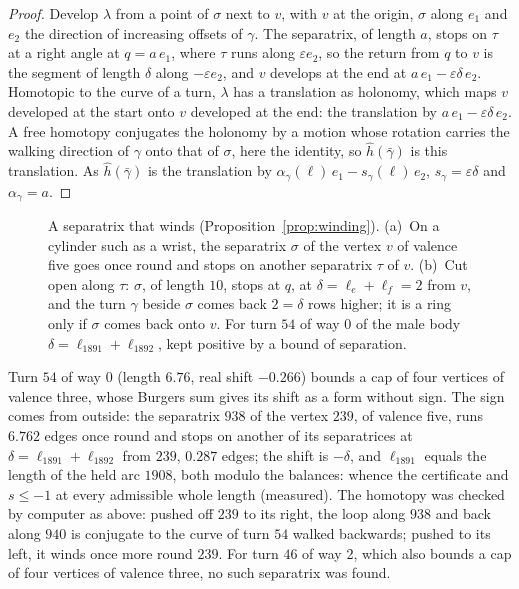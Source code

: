 \documentclass[11pt,a4paper]{article}
\newcommand{\shift}{s}
\begin{document}
\begin{proof}
Develop $\lambda$ from a point of $\sigma$ next to $v$, with $v$ at the origin,
$\sigma$ along $e_1$ and $e_2$ the direction of increasing offsets of
$\gamma$. The separatrix, of length $a$, stops on $\tau$ at a right angle at
$q = a\,e_1$, where $\tau$ runs along $\varepsilon e_2$, so the return from
$q$ to $v$ is the segment of length $\delta$ along $-\varepsilon e_2$, and $v$
develops at the end at $a\,e_1 - \varepsilon\delta\,e_2$. Homotopic to the
curve of a turn, $\lambda$ has a translation as holonomy, which maps $v$
developed at the start onto $v$ developed at the end: the translation by $a\,e_1
- \varepsilon\delta\,e_2$. A free homotopy conjugates the holonomy by a motion
whose rotation carries the walking direction of $\gamma$ onto that of
$\sigma$, here the identity, so $\hat h(\bar\gamma)$ is this translation. As
$\hat h(\bar\gamma)$ is the translation by $\alpha_\gamma(\ell)\,e_1 -
\shift_\gamma(\ell)\,e_2$, $\shift_\gamma = \varepsilon\delta$ and
$\alpha_\gamma = a$.
\end{proof}

\begin{figure}[t]
\centering

\caption{A separatrix that winds (Proposition~\ref{prop:winding}). (a)~On
a cylinder such as a wrist, the separatrix $\sigma$ of the vertex $v$ of
valence five goes once round and stops on another separatrix $\tau$ of $v$.
(b)~Cut open along $\tau$: $\sigma$, of length $10$, stops at $q$, at
$\delta = \ell_e + \ell_f = 2$ from $v$, and the turn $\gamma$ beside
$\sigma$ comes back $2 = \delta$ rows higher; it is a ring only if $\sigma$
comes back onto $v$. For turn $54$ of way 0 of the male body $\delta =
\ell_{1891} + \ell_{1892}$, kept positive by a bound of separation.}
\label{fig:separatrix}
\end{figure}

Turn $54$ of way 0 (length $6.76$, real shift $-0.266$) bounds a cap of four
vertices of valence three, whose Burgers sum gives its shift as a form
without sign. The sign comes from outside: the separatrix $938$ of the vertex
$239$, of valence five, runs $6.762$ edges once round and stops on another of
its separatrices at $\delta = \ell_{1891} + \ell_{1892}$ from $239$, $0.287$
edges; the shift is $-\delta$, and $\ell_{1891}$ equals the length of the held
arc $1908$, both modulo the balances: whence the certificate and $\shift \le
-1$ at every admissible whole length (measured). The homotopy was checked by
computer as above: pushed off $239$ to its right, the loop along $938$ and
back along $940$ is conjugate to the curve of turn $54$ walked backwards;
pushed to its left, it winds once more round $239$. For turn $46$ of way 2, which also bounds a cap of four
vertices of valence three, no such separatrix was found.
\end{document}
